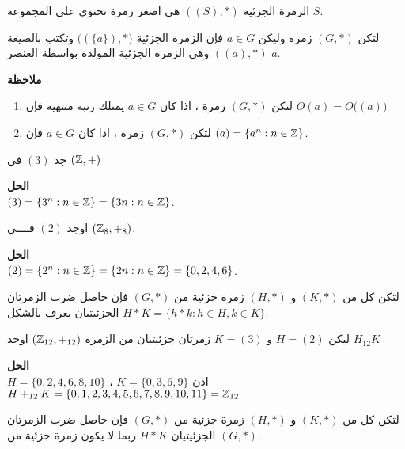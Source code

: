    \begin{note}
   	الزمرة الجزئية $((S), *)$ هي اصغر زمرة تحتوي على المجموعة $S$.
   \end{note}
   
\begin{definition}
	لتكن $(G, *)$ زمرة وليكن $a\in G$ فإن الزمرة الجزئية 	$\big((\{a\}) , *\big)$ وتكتب بالصيغة $((a), *) $ وهي الزمرة الجزئية المولدة بواسطة العنصر $a$.
\end{definition}

\noindent
\textbf{ملاحظة}
\begin{enumerate}
	\item لتكن $(G, *)$ زمرة ، اذا كان $a\in G$ يمتلك رتبة منتهية فإن $O(a) = O\Big((a)\Big)$
	\item  لتكن $(G, *)$ زمرة ، اذا كان $a\in G$ فإن $(a) = \{a^n : n\in \mathbb{Z}\}$.
\end{enumerate}

\begin{example}
	جد $(3)$ في $(\mathbb{Z}, +)$
\end{example}
   \noindent
   \textbf{الحل}\\
   \noindent
   $(3) = \{3^n : n\in \mathbb{Z}\} = \{3n : n\in \mathbb{Z}\}$.
   
   \begin{example}
   	اوجد $(2)$ فــــي $(\mathbb{Z}_8, +_8)$.
   \end{example}
   \noindent
   \textbf{الحل}\\
   \noindent
   $(2) = \{2^n : n\in \mathbb{Z}\} = \{2n : n\in \mathbb{Z}\} = \{0,2,4,6\}$.
   
\begin{definition}
	لتكن كل من $(K, *)$ و $(H, *)$ زمرة جزئية من $(G, *)$ فإن حاصل ضرب الزمرتان الجزئيتيان يعرف بالشكل
	$
	H * K = \{h * k : h \in H, k \in K\}
	$.
\end{definition}

\begin{example}
	ليكن $H=(2)$ و $K=(3)$ زمرتان جزئيتيان من الزمرة $(\mathbb{Z}_{12}, +_{12})$ اوجد $H_{12}K$
\end{example}
\noindent
\textbf{الحل}\\
\noindent
$H=\{0,2,4,6,8,10\}$ ، $K=\{0,3,6,9\}$ اذن\\
 $H+_{12} K=\{0,1,2,3,4,5,6,7,8,9,10,11\} = \mathbb{Z}_{12}$
 
 \begin{note}
 		لتكن كل من $(K, *)$ و $(H, *)$ زمرة جزئية من $(G, *)$ فإن حاصل ضرب الزمرتان الجزئيتيان $H*K$ ربما لا يكون زمرة جزئية من $(G,*)$.
 \end{note}
 
